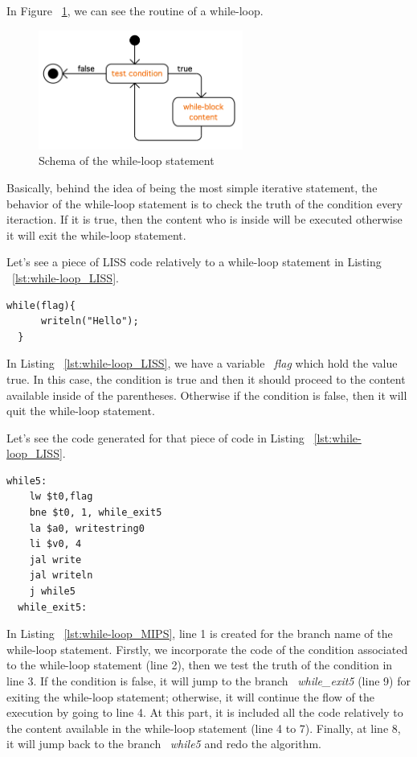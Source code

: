\documentclass[
  oneside,
  11pt, a4paper,
  footinclude=true,
  headinclude=true,
  cleardoublepage=empty
]{scrbook}
\begin{document}
In Figure ~\ref{fig:for-loop_inArray}, we can see the routine of a while-loop.

\begin{figure}[h!]
  \centering
    \includegraphics[width=0.6\textwidth]{img/while-loop.png}
    \caption{Schema of the while-loop statement}
    \label{fig:for-loop_inArray}
\end{figure}

Basically, behind the idea of being the most simple iterative statement, the behavior of the while-loop statement is to check the truth of the condition every iteraction. If it is true, then the content who is inside will be executed otherwise it will exit the while-loop statement.

Let's see a piece of LISS code relatively to a while-loop statement in Listing ~\ref{lst:while-loop_LISS}.

\begin{lstlisting}[caption={Example of a while-loop statement in LISS},label={lst:while-loop_LISS}]
  while(flag){
      writeln("Hello");
  }
\end{lstlisting}

In Listing ~\ref{lst:while-loop_LISS}, we have a variable ~\textit{flag} which hold the value true. In this case, the condition is true and then it should proceed to the content available inside of the parentheses. Otherwise if the condition is false, then it will quit the while-loop statement.

Let's see the code generated for that piece of code in Listing ~\ref{lst:while-loop_LISS}.

\begin{lstlisting}[caption={Code generated for the LISS code in Listing ~\ref{lst:while-loop_LISS}},label={lst:while-loop_MIPS}]
  while5:		
    lw $t0,flag		
    bne $t0, 1, while_exit5	
    la $a0, writestring0
    li $v0, 4
    jal write		
    jal writeln		
    j while5		
  while_exit5:		
\end{lstlisting}

In Listing ~\ref{lst:while-loop_MIPS}, line 1 is created for the branch name of the while-loop statement. Firstly, we incorporate the code of the condition associated to the while-loop statement (line 2), then we test the truth of the condition in line 3. If the condition is false, it will jump to the branch ~\textit{while\_exit5} (line 9) for exiting the while-loop statement; otherwise, it will continue the flow of the execution by going to line 4. At this part, it is included all the code relatively to the content available in the while-loop statement (line 4 to 7). Finally, at line 8, it will jump back to the branch ~\textit{while5} and redo the algorithm.
\end{document}
